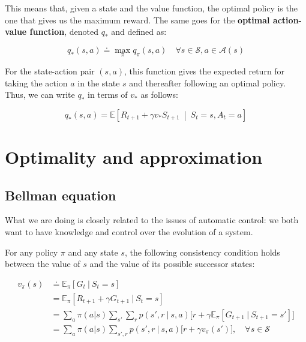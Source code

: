 This means that, given a state and the value function, the optimal policy is the one that gives us the maximum reward. The same goes for the \textbf{optimal action-value function}, denoted $q_*$ and defined as:

\begin{equation}
    q_*(s,a) \doteq \max_\pi q_\pi(s,a) \quad \forall s \in \mathcal{S}, a \in \mathcal{A}(s)
    \label{eq:ch2-optimalactionvaluefunction}
\end{equation}

For the state-action pair $(s,a)$, this function gives the expected return for taking the action $a$ in the state $s$ and thereafter following an optimal policy. Thus, we can write $q_*$ in terms of $v_*$ as follows:

\begin{equation*}
    q_*(s,a) = \mathbb{E} \left[ R_{t+1} + \gamma v_* S_{t+1} \  \middle\vert \ S_t = s, A_t = a \right]
\end{equation*}

\section{Optimality and approximation}
\subsection{Bellman equation}
What we are doing is closely related to the issues of automatic control: we both want to have knowledge and control over the evolution of a system.

For any policy $\pi$ and any state $s$, the following consistency condition holds between the value of $s$ and the value of its possible successor states:

\begin{equation}
    \begin{split}
        v_\pi(s) & \doteq \mathbb{E}_\pi \left[ G_t \ \vert \ S_t = s \right] \\
        & = \mathbb{E}_\pi \left[ R_{t+1} + \gamma G_{t+1} \ \vert \ S_t = s \right] \\
        & = \sum_{a} \pi(a \vert s) \sum_{s'} \sum_{r} p(s',r \ \vert \ s,a) \Big[ r + \gamma \mathbb{E}_\pi \left[ G_{t+1} \ \vert \ S_{t+1} = s' \right] \Big] \\
        & = \sum_{a} \pi (a \vert s) \sum_{s', r} p(s', r \ \vert \ s,a) \Big[ r + \gamma v_\pi(s') \Big], \quad \forall s \in \mathcal{S}
    \end{split}
    \label{eq:ch2-bellmanequation}
\end{equation}


